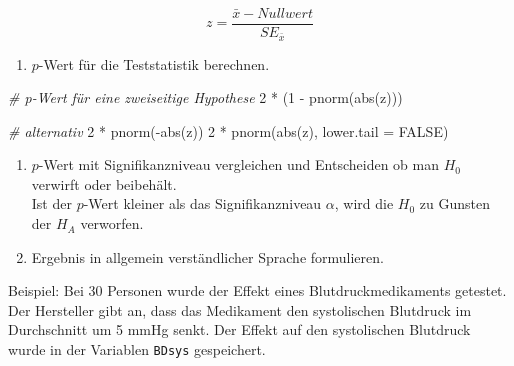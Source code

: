 \documentclass[
]{book}
\newenvironment{Shaded}{\begin{snugshade}}{\end{snugshade}}
\newcommand{\AttributeTok}[1]{\textcolor[rgb]{0.77,0.63,0.00}{#1}}
\newcommand{\CommentTok}[1]{\textcolor[rgb]{0.56,0.35,0.01}{\textit{#1}}}
\newcommand{\ConstantTok}[1]{\textcolor[rgb]{0.00,0.00,0.00}{#1}}
\newcommand{\DecValTok}[1]{\textcolor[rgb]{0.00,0.00,0.81}{#1}}
\newcommand{\FunctionTok}[1]{\textcolor[rgb]{0.00,0.00,0.00}{#1}}
\newcommand{\NormalTok}[1]{#1}
\newcommand{\SpecialCharTok}[1]{\textcolor[rgb]{0.00,0.00,0.00}{#1}}
\providecommand{\tightlist}{%
  \setlength{\itemsep}{0pt}\setlength{\parskip}{0pt}}
\begin{document}
\begin{equation}
 z = \frac{\bar{x} - Nullwert}{SE_{\bar{x}}}
  \label{eq:z-ztest}
\end{equation}

\begin{enumerate}
\def\labelenumi{\arabic{enumi}.}
\setcounter{enumi}{5}
\tightlist
\item
  \(p\)-Wert für die Teststatistik berechnen.
\end{enumerate}

\begin{Shaded}
\begin{Highlighting}[]
\CommentTok{\# p{-}Wert für eine zweiseitige Hypothese}
\DecValTok{2} \SpecialCharTok{*}\NormalTok{ (}\DecValTok{1} \SpecialCharTok{{-}} \FunctionTok{pnorm}\NormalTok{(}\FunctionTok{abs}\NormalTok{(z)))}

\CommentTok{\# alternativ}
\DecValTok{2} \SpecialCharTok{*} \FunctionTok{pnorm}\NormalTok{(}\SpecialCharTok{{-}}\FunctionTok{abs}\NormalTok{(z))}
\DecValTok{2} \SpecialCharTok{*} \FunctionTok{pnorm}\NormalTok{(}\FunctionTok{abs}\NormalTok{(z), }\AttributeTok{lower.tail =} \ConstantTok{FALSE}\NormalTok{)}
\end{Highlighting}
\end{Shaded}

\begin{enumerate}
\def\labelenumi{\arabic{enumi}.}
\setcounter{enumi}{6}
\item
  \(p\)-Wert mit Signifikanzniveau vergleichen und Entscheiden ob man \(H_0\) verwirft oder beibehält.\\
  Ist der \(p\)-Wert kleiner als das Signifikanzniveau \(\alpha\), wird die \(H_0\) zu Gunsten der \(H_A\) verworfen.
\item
  Ergebnis in allgemein verständlicher Sprache formulieren.
\end{enumerate}

Beispiel: Bei 30 Personen wurde der Effekt eines Blutdruckmedikaments getestet. Der Hersteller gibt an, dass das Medikament den systolischen Blutdruck im Durchschnitt um 5 mmHg senkt. Der Effekt auf den systolischen Blutdruck wurde in der Variablen \texttt{BDsys} gespeichert.
\end{document}
